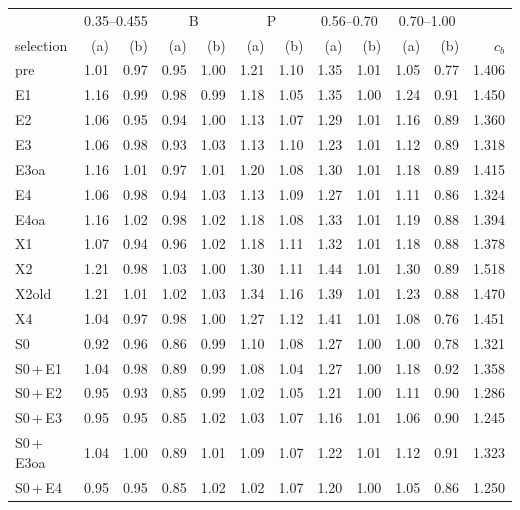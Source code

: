 \begin{tabular}{@{}l r r r r r r r r r r r@{}}
\toprule
& \multicolumn{2}{c}{0.35--0.455} & \multicolumn{2}{c}{B} & \multicolumn{2}{c}{P} & \multicolumn{2}{c}{0.56--0.70} & \multicolumn{2}{c}{0.70--1.00} & \\
selection & (a) & (b) & (a) & (b) & (a) & (b) & (a) & (b) & (a) & (b) & $c_b$ \\
\midrule
pre & 1.01 & 0.97 & 0.95 & 1.00 & 1.21 & 1.10 & 1.35 & 1.01 & 1.05 & 0.77 & 1.406 \\
E1 & 1.16 & 0.99 & 0.98 & 0.99 & 1.18 & 1.05 & 1.35 & 1.00 & 1.24 & 0.91 & 1.450 \\
E2 & 1.06 & 0.95 & 0.94 & 1.00 & 1.13 & 1.07 & 1.29 & 1.01 & 1.16 & 0.89 & 1.360 \\
E3 & 1.06 & 0.98 & 0.93 & 1.03 & 1.13 & 1.10 & 1.23 & 1.01 & 1.12 & 0.89 & 1.318 \\
E3oa & 1.16 & 1.01 & 0.97 & 1.01 & 1.20 & 1.08 & 1.30 & 1.01 & 1.18 & 0.89 & 1.415 \\
E4 & 1.06 & 0.98 & 0.94 & 1.03 & 1.13 & 1.09 & 1.27 & 1.01 & 1.11 & 0.86 & 1.324 \\
E4oa & 1.16 & 1.02 & 0.98 & 1.02 & 1.18 & 1.08 & 1.33 & 1.01 & 1.19 & 0.88 & 1.394 \\
X1 & 1.07 & 0.94 & 0.96 & 1.02 & 1.18 & 1.11 & 1.32 & 1.01 & 1.18 & 0.88 & 1.378 \\
X2 & 1.21 & 0.98 & 1.03 & 1.00 & 1.30 & 1.11 & 1.44 & 1.01 & 1.30 & 0.89 & 1.518 \\
X2old & 1.21 & 1.01 & 1.02 & 1.03 & 1.34 & 1.16 & 1.39 & 1.01 & 1.23 & 0.88 & 1.470 \\
X4 & 1.04 & 0.97 & 0.98 & 1.00 & 1.27 & 1.12 & 1.41 & 1.01 & 1.08 & 0.76 & 1.451 \\
\midrule
S0 & 0.92 & 0.96 & 0.86 & 0.99 & 1.10 & 1.08 & 1.27 & 1.00 & 1.00 & 0.78 & 1.321 \\
S0\,+\,E1 & 1.04 & 0.98 & 0.89 & 0.99 & 1.08 & 1.04 & 1.27 & 1.00 & 1.18 & 0.92 & 1.358 \\
S0\,+\,E2 & 0.95 & 0.93 & 0.85 & 0.99 & 1.02 & 1.05 & 1.21 & 1.00 & 1.11 & 0.90 & 1.286 \\
S0\,+\,E3 & 0.95 & 0.95 & 0.85 & 1.02 & 1.03 & 1.07 & 1.16 & 1.01 & 1.06 & 0.90 & 1.245 \\
S0\,+\,E3oa & 1.04 & 1.00 & 0.89 & 1.01 & 1.09 & 1.07 & 1.22 & 1.01 & 1.12 & 0.91 & 1.323 \\
S0\,+\,E4 & 0.95 & 0.95 & 0.85 & 1.02 & 1.02 & 1.07 & 1.20 & 1.00 & 1.05 & 0.86 & 1.250 \\

\end{tabular}
